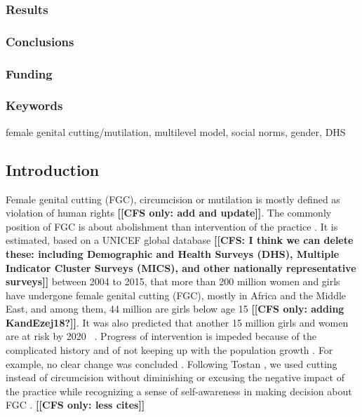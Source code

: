 \documentclass[12pt,]{article}
\newcommand{\comment}[1]{\textbf{[[#1]]}}
\newcommand{\cfcmt}[1]{\comment{CFS: #1}}
\newcommand{\cfonly}[1]{\comment{CFS only: #1}}
\begin{document}
\subsubsection{Results}\label{results}

\subsubsection{Conclusions}\label{conclusions}

\subsubsection{Funding}\label{funding}

\subsubsection{Keywords}\label{keywords}

female genital cutting/mutilation, multilevel model, social norms, gender, DHS

\subsection{Introduction}\label{introduction}

Female genital cutting (FGC), circumcision or mutilation is mostly defined as violation of human rights \cite{WHO97, WHO08} \cfonly{add and update}.  The commonly position of FGC is about abolishment than intervention of the practice \cite{KhosBane17, Mack96, Toub94, UNIC16, WHO97}.  It is estimated, based on a UNICEF global database \cite{AdnrLesc16, UNIC16} \cfcmt{I think we can delete these: including Demographic and Health Surveys (DHS), Multiple Indicator Cluster Surveys (MICS), and other nationally representative surveys} between 2004 to 2015, that more than 200 million women and girls have undergone female genital cutting (FGC), mostly in Africa and the Middle East, and among them, 44 million are girls below age 15 \cfonly{adding KandEzej18?}.  It was also predicted that another 15 million girls and women are at risk by 2020  \cite{AdnrLesc16, UNIC16}.  Progress of intervention is impeded because of the complicated history \cite{BergDeni12, Cami16} and of not keeping up with the population growth \cite{KhosBane17, UNIC16}.  For example, no clear change was concluded \cite{KandShel19}.  Following Tostan \cite{Tost15}, we used cutting instead of circumcision without diminishing or excusing the negative impact of the practice while recognizing a sense of self-awareness in making decision about FGC \cite{KhahBark09, JohnEsse10, Meye00, PariSaru18, Shel01, Tost15}. \cfonly{less cites}
\end{document}
